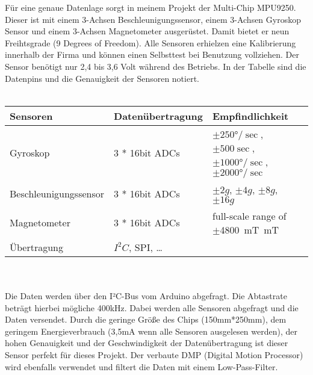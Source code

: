 Für eine genaue Datenlage sorgt in meinem Projekt der Multi-Chip MPU9250. Dieser ist mit 
einem 3-Achsen Beschleunigungssensor, einem 3-Achsen Gyroskop Sensor und einem 3-Achsen 
Magnetometer ausgerüstet. Damit bietet er neun Freihtsgrade (9 Degrees of Freedom).
Alle Sensoren erhielzen eine Kalibrierung innerhalb der 
Firma und können einen Selbsttest bei Benutzung vollziehen. Der Sensor benötigt nur 2,4 bis 3,6 Volt während 
des Betriebs. In der Tabelle sind die Datenpins und die Genauigkeit der Sensoren notiert.\\
\\
\begin{tabularx}{0.8\textwidth}{l|X|XX}
Sensoren & Datenübertragung & Empfindlichkeit                                     \\
\hline
Gyroskop & 3 * 16bit ADCs & $\pm250°/\sec$, $\pm500\sec$, $\pm1000°/\sec$, $\pm2000°/\sec$\\ 
\hline
Beschleunigungssensor & 3 * 16bit ADCs & $\pm2g$, $\pm4g$, $\pm8g$, $\pm16g$\\
\hline
Magnetometer & 3 * 16bit ADCs & full-scale range of $\pm$\SI{4800}{\milli\tesla\meter}T \\
\hline
Übertragung & $I^2C$, SPI, \dots & \\
\end{tabularx}
\\
\\
Die Daten werden über den I²C-Bus vom Arduino abgefragt. Die Abtastrate beträgt hierbei 
mögliche 400kHz. Dabei werden alle Sensoren abgefragt und die Daten versendet.
Durch die geringe Größe des Chips (150mm*250mm), dem geringem Energieverbrauch (3,5mA wenn 
alle Sensoren ausgelesen werden), der hohen Genauigkeit und der Geschwindigkeit der 
Datenübertragung ist dieser Sensor perfekt für dieses Projekt. Der verbaute
DMP (Digital Motion Processor) wird ebenfalls verwendet und filtert die Daten mit einem
Low-Pass-Filter.

